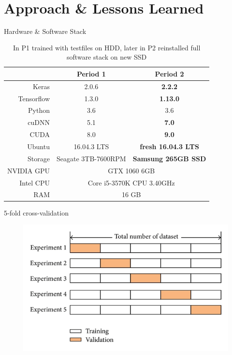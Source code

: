 \documentclass{beamer}
\begin{document}
\section{Approach \& Lessons Learned}
\begin{frame}{Hardware \& Software Stack}
\begin{table}
\begin{tabular}{r|cc}
& \textbf{Period 1} & \textbf{Period 2} \\ \hline
Keras &  2.0.6 & \textbf{2.2.2} \\
Tensorflow & 1.3.0 & \textbf{1.13.0} \\
Python & 3.6 & 3.6 \\
cuDNN & 5.1 & \textbf{7.0} \\ 
CUDA & 8.0 & \textbf{9.0} \\
Ubuntu & 16.04.3 LTS & \textbf{fresh 16.04.3 LTS} \\
Storage & Seagate 3TB-7600RPM & \textbf{Samsung 265GB SSD} \\
NVIDIA GPU & \multicolumn{2}{c}{GTX 1060 6GB} \\
Intel CPU &  \multicolumn{2}{c}{Core i5-3570K CPU \@ 3.40GHz} \\
RAM & \multicolumn{2}{c}{16 GB} \\
\end{tabular}
\caption{In P1 trained with testfiles on HDD, later in P2 reinstalled full software stack on new SSD}
\end{table}
\end{frame}

\begin{frame}{5-fold cross-validation}
\begin{figure}
\includegraphics[width=\textwidth]{5foldCV}
\end{figure}
\end{frame}
\end{document}
